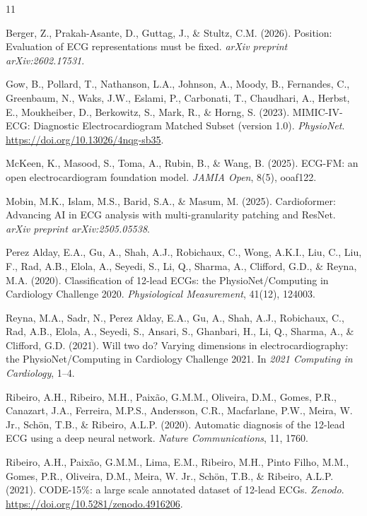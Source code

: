 \documentclass[conference]{IEEEtran}
\begin{document}
\begin{thebibliography}{11}

Berger, Z., Prakah-Asante, D., Guttag, J., \& Stultz, C.M. (2026).
Position: Evaluation of ECG representations must be fixed.
\textit{arXiv preprint arXiv:2602.17531}.

Gow, B., Pollard, T., Nathanson, L.A., Johnson, A., Moody, B., Fernandes, C., Greenbaum, N., Waks, J.W., Eslami, P., Carbonati, T., Chaudhari, A., Herbst, E., Moukheiber, D., Berkowitz, S., Mark, R., \& Horng, S. (2023).
MIMIC-IV-ECG: Diagnostic Electrocardiogram Matched Subset (version 1.0).
\textit{PhysioNet}. \url{https://doi.org/10.13026/4nqg-sb35}.

McKeen, K., Masood, S., Toma, A., Rubin, B., \& Wang, B. (2025).
ECG-FM: an open electrocardiogram foundation model.
\textit{JAMIA Open}, 8(5), ooaf122.

Mobin, M.K., Islam, M.S., Barid, S.A., \& Masum, M. (2025).
Cardioformer: Advancing AI in ECG analysis with multi-granularity patching and ResNet.
\textit{arXiv preprint arXiv:2505.05538}.

Perez Alday, E.A., Gu, A., Shah, A.J., Robichaux, C., Wong, A.K.I., Liu, C., Liu, F., Rad, A.B., Elola, A., Seyedi, S., Li, Q., Sharma, A., Clifford, G.D., \& Reyna, M.A. (2020).
Classification of 12-lead ECGs: the PhysioNet/Computing in Cardiology Challenge 2020.
\textit{Physiological Measurement}, 41(12), 124003.

Reyna, M.A., Sadr, N., Perez Alday, E.A., Gu, A., Shah, A.J., Robichaux, C., Rad, A.B., Elola, A., Seyedi, S., Ansari, S., Ghanbari, H., Li, Q., Sharma, A., \& Clifford, G.D. (2021).
Will two do? Varying dimensions in electrocardiography: the PhysioNet/Computing in Cardiology Challenge 2021.
In \textit{2021 Computing in Cardiology}, 1--4.

Ribeiro, A.H., Ribeiro, M.H., Paix\~{a}o, G.M.M., Oliveira, D.M., Gomes, P.R., Canazart, J.A., Ferreira, M.P.S., Andersson, C.R., Macfarlane, P.W., Meira, W. Jr., Sch\"{o}n, T.B., \& Ribeiro, A.L.P. (2020).
Automatic diagnosis of the 12-lead ECG using a deep neural network.
\textit{Nature Communications}, 11, 1760.

Ribeiro, A.H., Paix\~{a}o, G.M.M., Lima, E.M., Ribeiro, M.H., Pinto Filho, M.M., Gomes, P.R., Oliveira, D.M., Meira, W. Jr., Sch\"{o}n, T.B., \& Ribeiro, A.L.P. (2021).
CODE-15\%: a large scale annotated dataset of 12-lead ECGs.
\textit{Zenodo}. \url{https://doi.org/10.5281/zenodo.4916206}.


\end{thebibliography}
\end{document}
